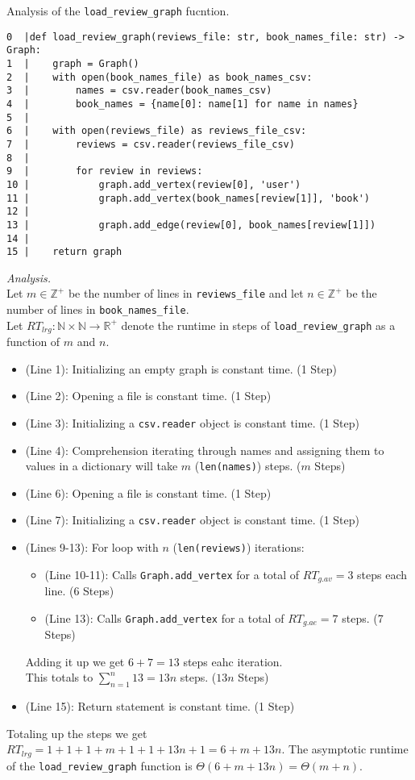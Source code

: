 \documentclass[11pt]{article}
\newcommand{\Z}{\mathbb{Z}}
\begin{document}
\begin{enumerate}
Analysis of the \texttt{load\_review\_graph} fucntion.
\begin{verbatim}
0  |def load_review_graph(reviews_file: str, book_names_file: str) -> Graph:
1  |    graph = Graph()
2  |    with open(book_names_file) as book_names_csv:
3  |        names = csv.reader(book_names_csv)
4  |        book_names = {name[0]: name[1] for name in names}
5  |
6  |    with open(reviews_file) as reviews_file_csv:
7  |        reviews = csv.reader(reviews_file_csv)
8  |
9  |        for review in reviews:
10 |            graph.add_vertex(review[0], 'user')
11 |            graph.add_vertex(book_names[review[1]], 'book')
12 |
13 |            graph.add_edge(review[0], book_names[review[1]])
14 |
15 |    return graph
\end{verbatim}
\textit{Analysis.}\\
Let $m \in \Z^+$ be the number of lines in \texttt{reviews\_file} and let $n \in \Z^+$ be the number of lines in 
\texttt{book\_names\_file}.\\
Let $RT_{lrg} : \mathbb{N} \times \mathbb{N} \to \mathbb{R}^+$ denote the runtime in steps of \texttt{load\_review\_graph} as a function of $m$ and $n$.
\begin{itemize}
    \item (Line 1): Initializing an empty graph is constant time. (1 Step)
    \item (Line 2): Opening a file is constant time. (1 Step)
    \item (Line 3): Initializing a \texttt{csv.reader} object is constant time. (1 Step)
    \item (Line 4): Comprehension iterating through names and assigning them to values in a dictionary 
    will take $m$ (\texttt{len(names)}) steps. ($m$ Steps)
    \item (Line 6): Opening a file is constant time. (1 Step)
    \item (Line 7): Initializing a \texttt{csv.reader} object is constant time. (1 Step)
    \item (Lines 9-13): For loop with $n$ (\texttt{len(reviews)}) iterations: 
    \begin{itemize}
        \item (Line 10-11): Calls \texttt{Graph.add\_vertex} for a total of $RT_{g.av} = 3$ steps each line. (6 Steps) 
        \item (Line 13): Calls \texttt{Graph.add\_vertex} for a total of $RT_{g.ae} = 7$ steps. (7 Steps)
    \end{itemize}
    Adding it up we get $6 + 7 = 13$ steps eahc iteration.\\
    This totals to $\displaystyle \sum_{n = 1}^{n} 13 = 13 n$ steps. ($13 n$ Steps)
    \item (Line 15): Return statement is constant time. (1 Step)
\end{itemize}
Totaling up the steps we get $RT_{lrg} = 1 + 1 + 1 + m + 1 + 1 + 13n + 1 = 6 + m + 13n$.  The asymptotic runtime of 
the \texttt{load\_review\_graph} function is $\Theta(6 + m + 13n) = \Theta(m + n)$.


\end{enumerate}
\end{document}

